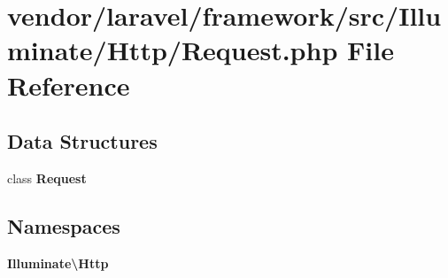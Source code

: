 \section{vendor/laravel/framework/src/\+Illuminate/\+Http/\+Request.php File Reference}
\label{vendor_2laravel_2framework_2src_2_illuminate_2_http_2_request_8php}
\subsection*{Data Structures}
\begin{DoxyCompactItemize}
\item 
class {\bf Request}
\end{DoxyCompactItemize}
\subsection*{Namespaces}
\begin{DoxyCompactItemize}
\item 
 {\bf Illuminate\textbackslash{}\+Http}
\end{DoxyCompactItemize}
